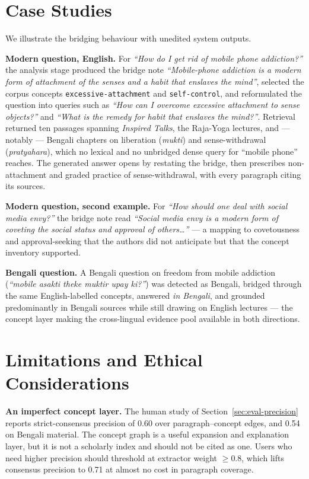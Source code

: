 \documentclass[11pt,a4paper]{article}
\begin{document}
\section{Case Studies}
\label{sec:cases}

We illustrate the bridging behaviour with unedited system outputs.

\textbf{Modern question, English.} For \emph{``How do I get rid of
mobile phone addiction?''} the analysis stage produced the bridge note
\emph{``Mobile-phone addiction is a modern form of attachment of the
senses and a habit that enslaves the mind''}, selected the corpus
concepts \texttt{excessive-attachment} and \texttt{self-control}, and
reformulated the question into queries such as \emph{``How can I
overcome excessive attachment to sense objects?''} and \emph{``What is
the remedy for habit that enslaves the mind?''}. Retrieval returned ten
passages spanning \emph{Inspired Talks}, the Raja-Yoga lectures, and ---
notably --- Bengali chapters on liberation (\emph{mukti}) and
sense-withdrawal (\emph{pratyahara}), which no lexical and no unbridged
dense query for ``mobile phone'' reaches. The generated answer opens by
restating the bridge, then prescribes non-attachment and graded practice
of sense-withdrawal, with every paragraph citing its sources.

\textbf{Modern question, second example.} For \emph{``How should one
deal with social media envy?''} the bridge note read \emph{``Social
media envy is a modern form of coveting the social status and approval
of others\ldots''} --- a mapping to covetousness and approval-seeking
that the authors did not anticipate but that the concept inventory
supported.

\textbf{Bengali question.} A Bengali question on freedom from mobile
addiction (\emph{``mobile asakti theke muktir upay ki?''}) was detected
as Bengali, bridged through the same English-labelled concepts, answered
\emph{in Bengali}, and grounded predominantly in Bengali sources while
still drawing on English lectures --- the concept layer making the
cross-lingual evidence pool available in both directions.

\section{Limitations and Ethical Considerations}
\label{sec:limitations}

\textbf{An imperfect concept layer.} The human study of
Section~\ref{sec:eval-precision} reports strict-consensus precision of
0.60 over paragraph--concept edges, and 0.54 on Bengali material. The
concept graph is a useful expansion and explanation layer, but it is not
a scholarly index and should not be cited as one. Users who need higher
precision should threshold at extractor weight $\geq 0.8$, which lifts
consensus precision to 0.71 at almost no cost in paragraph coverage.
\end{document}
